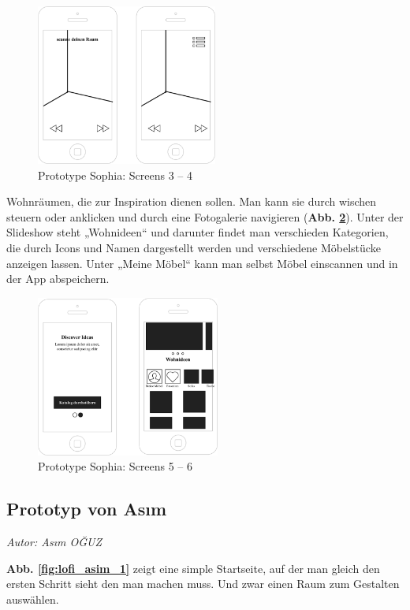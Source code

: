\documentclass[12pt,paper=a4,oneside,hidelinks,headings=small,captions=heading,captions=nooneline]{scrartcl}
\begin{document}
\begin{figure}[htbp]
\centering
\includegraphics[height=200px]{./img/m2_lofi_sophia_34.png}
\caption{\label{fig:lofi_sophia_34}Prototype Sophia: Screens 3 -- 4}
\end{figure}

Wohnräumen, die zur Inspiration dienen sollen. Man kann sie durch
wischen steuern oder anklicken und durch eine Fotogalerie navigieren
(\textbf{Abb. \ref{fig:lofi_sophia_56}}).  Unter der Slideshow steht „Wohnideen“ und
darunter findet man verschieden Kategorien, die durch Icons und Namen
dargestellt werden und verschiedene Möbelstücke anzeigen lassen. Unter
„Meine Möbel“ kann man selbst Möbel einscannen und in der App
abspeichern.

\begin{figure}[htbp]
\centering
\includegraphics[height=200px]{./img/m2_lofi_sophia_56.png}
\caption{\label{fig:lofi_sophia_56}Prototype Sophia: Screens 5 -- 6}
\end{figure}

\subsection{Prototyp von Asım}
\label{sec:orga3e5932}
\emph{Autor: Asım OĞUZ}

\textbf{Abb. \ref{fig:lofi_asim_1}} zeigt eine simple Startseite, auf der man gleich den ersten
Schritt sieht den man machen muss. Und zwar
einen Raum zum Gestalten auswählen.
\end{document}

